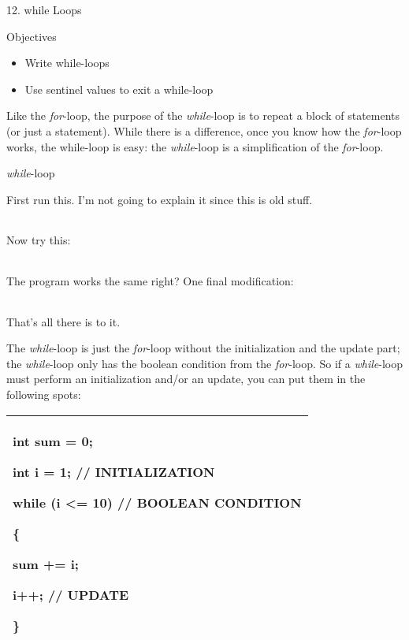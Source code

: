 \documentclass[
]{article}
\author{}
\date{}
\providecommand{\tightlist}{%
  \setlength{\itemsep}{0pt}\setlength{\parskip}{0pt}}
\begin{document}
12. while Loops

Objectives

\begin{itemize}
\tightlist
\item
  Write while-loops
\item
  Use sentinel values to exit a while-loop
\end{itemize}

Like the \emph{for}-loop, the purpose of the \emph{while}-loop is to
repeat a block of statements (or just a statement). While there is a
difference, once you know how the \emph{for}-loop works, the while-loop
is easy: the \emph{while}-loop is a simplification of the
\emph{for}-loop.

\emph{while}-loop

First run this. I'm not going to explain it since this is old stuff.

\begin{longtable}[]{@{}@{}}
\toprule
\endhead
\bottomrule
\end{longtable}

Now try this:

\begin{longtable}[]{@{}@{}}
\toprule
\endhead
\bottomrule
\end{longtable}

The program works the same right? One final modification:

\begin{longtable}[]{@{}@{}}
\toprule
\endhead
\bottomrule
\end{longtable}

That's all there is to it.

The \emph{while}-loop is just the \emph{for}-loop without the
initialization and the update part; the \emph{while}-loop only has the
boolean condition from the \emph{for}-loop. So if a \emph{while}-loop
must perform an initialization and/or an update, you can put them in the
following spots:

\begin{longtable}[]{@{}l@{}}
\toprule
\endhead
\begin{minipage}[t]{0.97\columnwidth}\raggedright
int sum = 0;

int i = 1; // INITIALIZATION

while (\textbf{i \textless= 10}) \textbf{// BOOLEAN CONDITION}

\{

sum += i;

i++; // UPDATE

\}\strut
\end{minipage}\tabularnewline
\bottomrule
\end{longtable}
\end{document}
